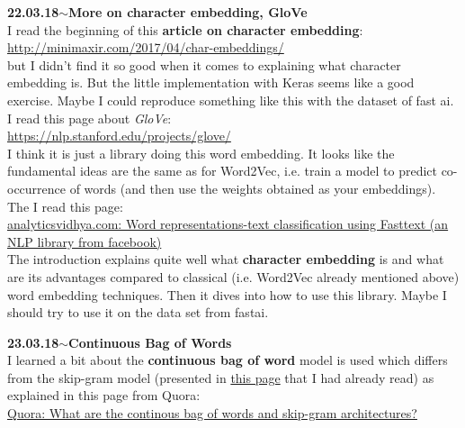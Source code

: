 \documentclass[11pt,a4paper]{article}
\newenvironment{loggentry}[2]%
{\noindent\textbf{#1}\hspace{1cm}$\mathbf{\sim}$\text{ }\textbf{#2}\\}{\vspace{0.5cm}}
\begin{document}
\begin{loggentry}{22.03.18}{More on character embedding, GloVe}
I read the beginning of this \textbf{article on character embedding}:\\
\url{http://minimaxir.com/2017/04/char-embeddings/}\\
but I didn't find it so good when it comes to explaining what character embedding is. But the little implementation with Keras seems like a good exercise. Maybe I could reproduce something like this with the dataset of fast ai.\\
I read this page about \textit{GloVe}:\\
\url{https://nlp.stanford.edu/projects/glove/}\\
I think it is just a library doing this word embedding. It looks like the fundamental ideas are the same as for Word2Vec, i.e. train a model to predict co-occurrence of words (and then use the weights obtained as your embeddings).\\
The I read this page:\\
\href{https://www.analyticsvidhya.com/blog/2017/07/word-representations-text-classification-using-fasttext-nlp-facebook/}{analyticsvidhya.com: Word representations-text classification using Fasttext (an NLP library from facebook)}\\
The introduction explains quite well what \textbf{character embedding} is and what are its advantages compared to classical (i.e. Word2Vec already mentioned above) word embedding techniques. Then it dives into how to use this library. Maybe I should try to use it on the data set from fastai.
\end{loggentry}

\begin{loggentry}{23.03.18}{Continuous Bag of Words}
I learned a bit about the \textbf{continuous bag of word} model is used which differs from the skip-gram model (presented in \href{http://mccormickml.com/2016/04/19/word2vec-tutorial-the-skip-gram-model/}{this page} that I had already read) as explained in this page from Quora:\\
\href{https://www.quora.com/What-are-the-continuous-bag-of-words-and-skip-gram-architectures}{Quora: What are the continous bag of words and skip-gram architectures?}\\
\end{loggentry}
\end{document}
